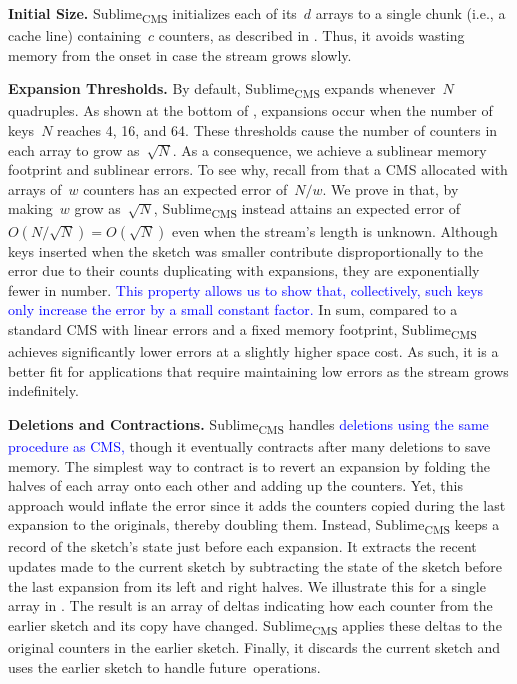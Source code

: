 \documentclass[sigconf]{acmart}
\newcommand{\sketch}{Sublime}
\newcommand{\sketchcms}{\sketch\textsubscript{CMS}\xspace}
\begin{document}
\textbf{Initial Size.}
\sketchcms initializes each of its~$d$ arrays to a single chunk (i.e., a cache
line) containing~$c$ counters, as described in .
Thus, it avoids wasting memory from the onset in case the stream grows slowly.

\textbf{Expansion Thresholds.} 
By default, \sketchcms expands whenever~$N$ quadruples. As shown at the bottom
of , expansions occur when the number of keys~$N$
reaches 4, 16, and 64. These thresholds cause the number of counters in each
array to grow as~$\sqrt{N}$. As a consequence, we achieve a sublinear memory
footprint and sublinear errors. To
see why, recall from  that a CMS allocated with arrays
of~$w$ counters has an expected error of~$N/w$. We prove in
\textcolor{blue}{}
that, by making~$w$ grow as~$\sqrt{N}$, \sketchcms instead attains an expected
error of~$O(N/\sqrt{N})=O(\sqrt{N})$ even when the stream's length is unknown.
Although keys inserted when the sketch was smaller contribute disproportionally
to the error due to their counts duplicating with expansions, they are
exponentially fewer in number. \textcolor{blue}{This property allows us to show
that, collectively, such keys only increase the error by a small constant
factor.} In sum, compared to a standard CMS with linear errors and a fixed
memory footprint, \sketchcms achieves significantly lower errors at a slightly
higher space cost. As such, it is a better fit for applications that require
maintaining low errors as the stream grows indefinitely. 

\textbf{Deletions and Contractions.} 
\sketchcms handles \textcolor{blue}{deletions using the same procedure as CMS,}
though it eventually contracts after many deletions to save memory. The
simplest way to contract is to revert an expansion by folding the halves of
each array onto each other and adding up the counters. Yet, this approach would
inflate the error since it adds the counters copied during the last expansion
to the originals, thereby doubling them. Instead, \sketchcms keeps a record of
the sketch's state just before each expansion. It extracts the recent updates
made to the current sketch by subtracting the state of the sketch before the
last expansion from its left and right halves. We illustrate this for a single
array in
.
The result is an array of deltas indicating how each counter from the earlier
sketch and its copy have changed. \sketchcms applies these deltas to the
original counters in the earlier sketch. Finally, it discards the current
sketch and uses the earlier sketch to handle future~operations.
\end{document}
